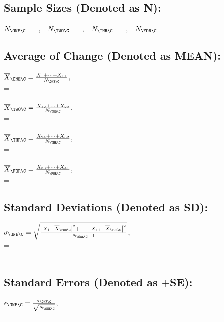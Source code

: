 \begin{center}
  \subsection*{Sample Sizes (Denoted as N):}
  \(N_{\ONE\C}\)~=~,~~\(N_{\TWO\C}\)~=~,~~\(N_{\THR\C}\)~=~,~~\(N_{\FOR\C}\)~=~
  \subsection*{Average of Change (Denoted as MEAN):}
  \(\overline{X}_{\ONE\C} =\frac{X_1 +\cdots + X_{11}}{N_{\ONE\C}}\),\\
  =~\\\text{}\\
  \(\overline{X}_{\TWO\C} =\frac{X_{12} +\cdots + X_{23}}{N_{\TWO\C}}\),\\
  =~\\\text{}\\
  \(\overline{X}_{\THR\C} =\frac{X_{24} +\cdots + X_{32}}{N_{\THR\C}}\),\\
  =~\\\text{}\\
  \(\overline{X}_{\FOR\C} =\frac{X_{33} +\cdots + X_{41}}{N_{\FOR\C}}\),\\
  =~\\
  \subsection*{Standard Deviations (Denoted as SD):}
  \(\sigma_{\ONE\C} =\sqrt{\frac{\left|X_1 - \overline{X}_{\FOR\C}\right|^2 +\cdots +\left|X_{11} - \overline{X}_{\FOR\C}\right|^2}{N_{\ONE\C} - 1}}\),\\
  =~\\\text{}\\
  \subsection*{Standard Errors (Denoted as \(\pm \)SE):}
  \(\epsilon_{\ONE\C} =\frac{\sigma_{\ONE\C}}{\sqrt{N_{\ONE\C}}}\),\\
  =~
\end{center}
\newpage
